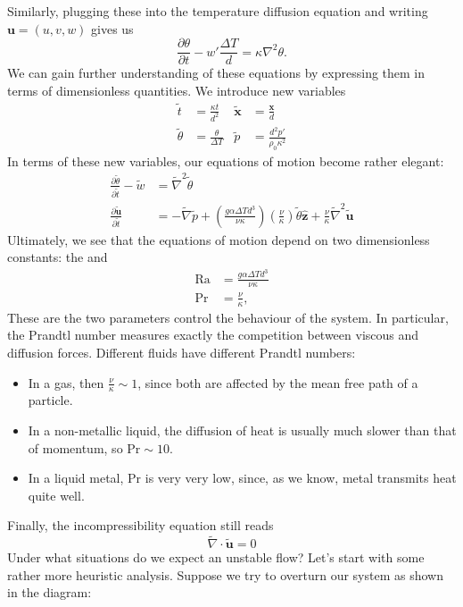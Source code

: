 \documentclass[a4paper]{article}
\newcommand\Ra{\mathrm{Ra}}
\renewcommand\Pr{\mathrm{Pr}}
\begin{document}
Similarly, plugging these into the temperature diffusion equation and writing $\mathbf{u} = (u, v, w)$ gives us
\[
  \frac{\partial \theta}{\partial t} - w' \frac{\Delta T}{d} = \kappa \nabla^2 \theta.
\]
We can gain further understanding of these equations by expressing them in terms of dimensionless quantities. We introduce new variables
\begin{align*}
  \tilde{t} &= \frac{\kappa t}{d^2} & \tilde{\mathbf{x}} &= \frac{\mathbf{x}}{d}\\
  \tilde{\theta} &= \frac{\theta}{\Delta T} & \tilde{p} &= \frac{d^2 p'}{\rho_0 \kappa^2}
\end{align*}
In terms of these new variables, our equations of motion become rather elegant:
\begin{align*}
  \frac{\partial \tilde{\theta}}{\partial \tilde{t}} - \tilde{w} &= \tilde{\nabla}^2 \tilde{\theta}\\
  \frac{\partial \tilde{\mathbf{u}}}{\partial \tilde{t}} &= - \tilde{\nabla} \tilde{p} + \left(\frac{g\alpha \Delta T d^3}{\nu\kappa}\right) \left(\frac{\nu}{\kappa}\right) \tilde{\theta} \hat{\mathbf{z}} + \frac{\nu}{\kappa} \tilde{\nabla}^2 \tilde{\mathbf{u}}
\end{align*}
Ultimately, we see that the equations of motion depend on two dimensionless constants: the  and 
\begin{align*}
  \Ra &= \frac{g\alpha \Delta T d^3}{\nu\kappa}\\
  \Pr &= \frac{\nu}{\kappa},
\end{align*}
These are the two parameters control the behaviour of the system. In particular, the Prandtl number measures exactly the competition between viscous and diffusion forces. Different fluids have different Prandtl numbers:
\begin{itemize}
  \item In a gas, then $\frac{\nu}{\kappa} \sim 1$, since both are affected by the mean free path of a particle.
  \item In a non-metallic liquid, the diffusion of heat is usually much slower than that of momentum, so $\Pr \sim 10$.
  \item In a liquid metal, $\Pr$ is very very low, since, as we know, metal transmits heat quite well.
\end{itemize}
Finally, the incompressibility equation still reads
\[
  \tilde{\nabla} \cdot \tilde{\mathbf{u}} = 0
\]
Under what situations do we expect an unstable flow? Let's start with some rather more heuristic analysis. Suppose we try to overturn our system as shown in the diagram:
\end{document}
